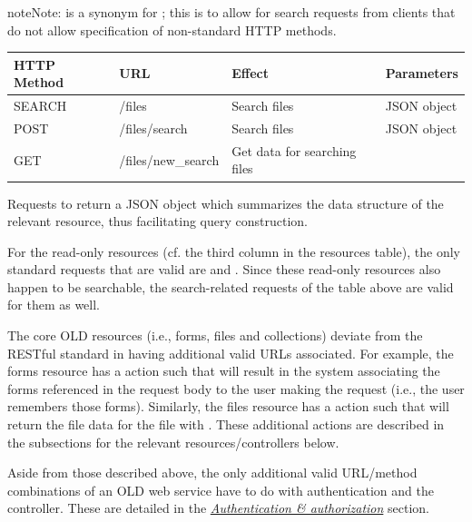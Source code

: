 \documentclass[letterpaper,10pt,english]{sphinxmanual}
\begin{document}
\begin{notice}{note}{Note:}
 is a synonym for ; this is to
allow for search requests from clients that do not allow specification of
non-standard HTTP methods.
\end{notice}

\begin{tabulary}{\linewidth}{|L|L|L|L|}
\hline
\textbf{
HTTP Method
} & \textbf{
URL
} & \textbf{
Effect
} & \textbf{
Parameters
}\\\hline

SEARCH
 & 
/files
 & 
Search files
 & 
JSON object
\\\hline

POST
 & 
/files/search
 & 
Search files
 & 
JSON object
\\\hline

GET
 & 
/files/new\_search
 & 
Get data for searching files
 & \\\hline
\end{tabulary}


Requests to  return a JSON object which summarizes
the data structure of the relevant resource, thus facilitating query
construction.

For the read-only resources (cf. the third column in the resources table), the
only standard requests that are valid are  and
.  Since these read-only resources also happen to be
searchable, the search-related requests of the table above are valid for them as
well.

The core OLD resources (i.e., forms, files and collections) deviate from the
RESTful standard in having additional valid URLs associated.  For example, the
forms resource has a  action such that  will
result in the system associating the forms referenced in the request body to
the user making the request (i.e., the user remembers those forms).  Similarly,
the files resource has a  action such that  will
return the file data for the file with .  These additional actions are
described in the subsections for the relevant resources/controllers below.

Aside from those described above, the only additional valid URL/method
combinations of an OLD web service have to do with authentication and the
 controller.  These are detailed in the {\hyperref[interface:auth]{\emph{Authentication \& authorization}}} section.
\end{document}
